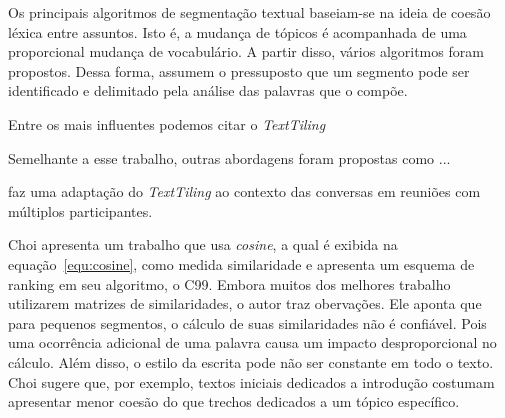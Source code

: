 
Os principais algoritmos de segmentação textual baseiam-se na ideia de coesão léxica entre assuntos. Isto é, a mudança de tópicos é acompanhada de uma proporcional mudança de vocabulário. A partir disso, vários algoritmos foram propostos. Dessa forma, assumem o pressuposto que um segmento pode ser identificado e delimitado pela análise das palavras que o compõe.








 
 










	
%



Entre os mais influentes podemos citar o \textit{TextTiling}~\cite{Hearst1994} 




Semelhante a esse trabalho, outras abordagens foram propostas como ...

\cite{Banerjee200657} faz uma adaptação do \textit{TextTiling} ao contexto das conversas em reuniões com múltiplos participantes.  




Choi \cite{Choi2000} apresenta um trabalho que usa \textit{cosine}, a qual é exibida na equação~\ref{equ:cosine}, como medida similaridade e apresenta um esquema de ranking em seu algoritmo, o C99. 
%
Embora muitos dos melhores trabalho utilizarem matrizes de similaridades, o autor traz obervações.
%
Ele aponta que para pequenos segmentos, o cálculo de suas similaridades não é confiável. Pois uma ocorrência adicional de uma palavra causa um impacto desproporcional no cálculo.
%
Além disso, o estilo da escrita pode não ser constante em todo o texto. Choi sugere que, por exemplo, textos iniciais dedicados a introdução costumam apresentar menor coesão do que trechos dedicados a um tópico específico. 
%

